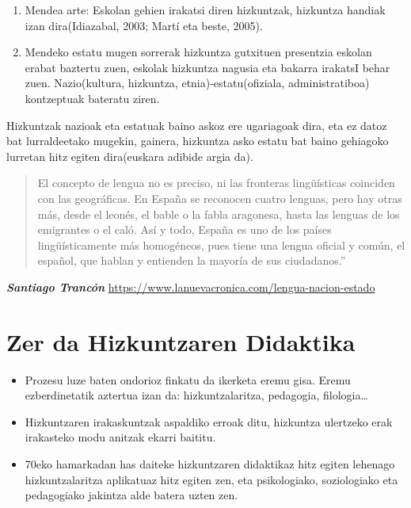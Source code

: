 \documentclass[]{book}
\providecommand{\tightlist}{%
  \setlength{\itemsep}{0pt}\setlength{\parskip}{0pt}}
\begin{document}
\begin{enumerate}
\def\labelenumi{\Roman{enumi}.}
\setcounter{enumi}{19}
\item
  Mendea arte: Eskolan gehien irakatsi diren hizkuntzak, hizkuntza handiak izan dira(Idiazabal, 2003; Martí eta beste, 2005).
\item
  Mendeko estatu mugen sorrerak hizkuntza gutxituen presentzia eskolan erabat baztertu zuen, eskolak hizkuntza nagusia eta bakarra irakatsI behar zuen. Nazio(kultura, hizkuntza, etnia)-estatu(ofiziala, administratiboa) kontzeptuak bateratu ziren.
\end{enumerate}

Hizkuntzak nazioak eta estatuak baino askoz ere ugariagoak dira, eta ez datoz bat lurraldeetako mugekin, gainera, hizkuntza asko estatu bat baino gehiagoko lurretan hitz egiten dira(euskara adibide argia da).

\begin{quote}
El concepto de lengua no es preciso, ni las fronteras lingüísticas coinciden con las geográficas. En España se reconocen cuatro lenguas, pero hay otras más, desde el leonés, el bable o la fabla aragonesa, hasta las lenguas de los emigrantes o el caló. Así y todo, España es uno de los países lingüísticamente más homogéneos, pues tiene una lengua oficial y común, el español, que hablan y entienden la mayoría de sus ciudadanos.''
\end{quote}

\emph{\textbf{Santiago Trancón }}\url{https://www.lanuevacronica.com/lengua-nacion-estado}

\hypertarget{zer-da-hizkuntzaren-didaktika}{%
\section{Zer da Hizkuntzaren Didaktika}\label{zer-da-hizkuntzaren-didaktika}}

\begin{itemize}
\tightlist
\item
  Prozesu luze baten ondorioz finkatu da ikerketa eremu gisa. Eremu ezberdinetatik aztertua izan da: hizkuntzalaritza, pedagogia, filologia\ldots{}
\item
  Hizkuntzaren irakaskuntzak aspaldiko erroak ditu, hizkuntza ulertzeko erak irakasteko modu anitzak ekarri baititu.
\item
  70eko hamarkadan has daiteke hizkuntzaren didaktikaz hitz egiten lehenago hizkuntzalaritza aplikatuaz hitz egiten zen, eta psikologiako, soziologiako eta pedagogiako jakintza alde batera uzten zen.
\end{itemize}
\end{document}
